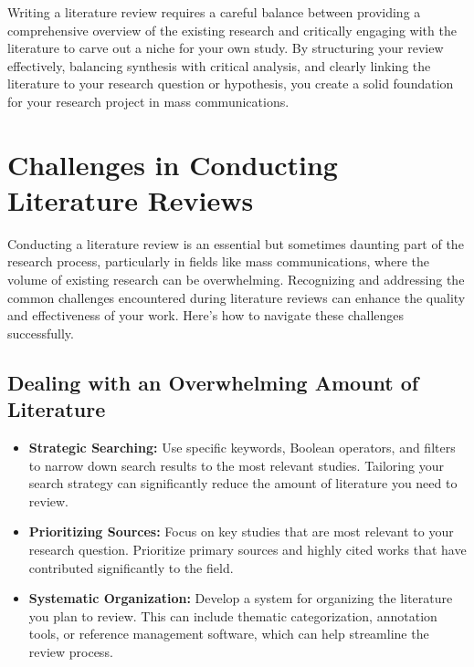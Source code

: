 \documentclass[
]{book}
\begin{document}
Writing a literature review requires a careful balance between providing a comprehensive overview of the existing research and critically engaging with the literature to carve out a niche for your own study. By structuring your review effectively, balancing synthesis with critical analysis, and clearly linking the literature to your research question or hypothesis, you create a solid foundation for your research project in mass communications.

\hypertarget{challenges-in-conducting-literature-reviews}{%
\section{Challenges in Conducting Literature Reviews}\label{challenges-in-conducting-literature-reviews}}

Conducting a literature review is an essential but sometimes daunting part of the research process, particularly in fields like mass communications, where the volume of existing research can be overwhelming. Recognizing and addressing the common challenges encountered during literature reviews can enhance the quality and effectiveness of your work. Here's how to navigate these challenges successfully.

\hypertarget{dealing-with-an-overwhelming-amount-of-literature}{%
\subsection*{Dealing with an Overwhelming Amount of Literature}\label{dealing-with-an-overwhelming-amount-of-literature}}

\begin{itemize}
\item
  \textbf{Strategic Searching:} Use specific keywords, Boolean operators, and filters to narrow down search results to the most relevant studies. Tailoring your search strategy can significantly reduce the amount of literature you need to review.
\item
  \textbf{Prioritizing Sources:} Focus on key studies that are most relevant to your research question. Prioritize primary sources and highly cited works that have contributed significantly to the field.
\item
  \textbf{Systematic Organization:} Develop a system for organizing the literature you plan to review. This can include thematic categorization, annotation tools, or reference management software, which can help streamline the review process.
\end{itemize}
\end{document}
